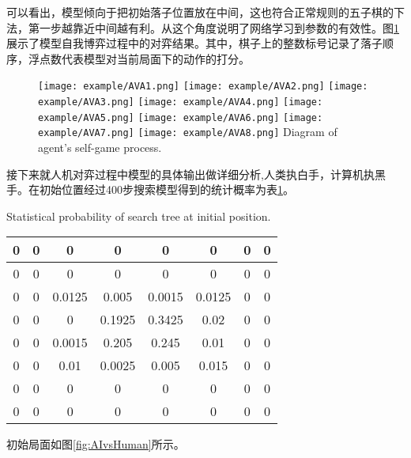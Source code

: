 可以看出，模型倾向于把初始落子位置放在中间，这也符合正常规则的五子棋的下法，第一步越靠近中间越有利。从这个角度说明了网络学习到参数的有效性。图\ref{figAIvsAI}展示了模型自我博弈过程中的对弈结果。其中，棋子上的整数标号记录了落子顺序，浮点数代表模型对当前局面下的动作的打分。

\begin{figure}[htpb]
	\centering
	\texttt{[image: example/AVA1.png]}
	\hspace{0.5cm}
	\texttt{[image: example/AVA2.png]}
	\hspace{0.5cm}
	\texttt{[image: example/AVA3.png]}
	\hspace{0.5cm}
	\texttt{[image: example/AVA4.png]}
	\hspace{0.5cm}
	\texttt{[image: example/AVA5.png]}
	\hspace{0.5cm}
	\texttt{[image: example/AVA6.png]}
	\hspace{0.5cm}
	\texttt{[image: example/AVA7.png]}
	\hspace{0.5cm}
	\texttt{[image: example/AVA8.png]}
	{Diagram of agent's self-game process.}
	\label{figAIvsAI}
\end{figure}

接下来就人机对弈过程中模型的具体输出做详细分析,人类执白手，计算机执黑手。在初始位置经过400步搜索模型得到的统计概率为表\ref{tab:moxinggailv2}。
\begin{table}[htbp]
	\centering
	{Statistical probability of search tree at initial position.}
	\label{tab:moxinggailv2}
\begin{tabular}{|c|c|c|c|c|c|c|c|}
	\hline 
	0& 0 & 0 & 0 & 0 & 0 &  0&  0\\ 
	\hline 
	0& 0 & 0 & 0 & 0 & 0 &  0&  0\\ 
	\hline 
	0 & 0 & 0.0125 & 0.005 & 0.0015 & 0.0125 & 0 & 0 \\ 
	\hline 
	0 & 0 & 0 & 0.1925 & 0.3425 & 0.02 & 0 & 0 \\ 
	\hline 
	0 & 0 & 0.0015 & 0.205 & 0.245 & 0.01 & 0 & 0 \\ 
	\hline 
	0 & 0 & 0.01 & 0.0025 & 0.005 & 0.015 & 0 & 0 \\ 
	\hline 
	0 & 0 & 0 & 0 & 0 & 0 & 0 & 0 \\ 
	\hline 
	0 & 0 & 0 & 0 & 0 & 0 & 0 & 0 \\  
	\hline 
\end{tabular} 
\end{table}
初始局面如图\ref{fig:AIvsHuman}所示。

